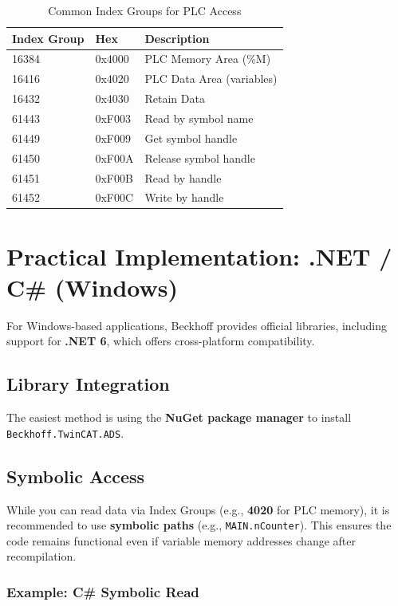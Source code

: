 \documentclass[11pt,a4paper]{article}
\begin{document}
\begin{table}[h]
\centering
\begin{tabular}{@{}lll@{}}
\toprule
\textbf{Index Group} & \textbf{Hex} & \textbf{Description} \\
\midrule
16384 & 0x4000 & PLC Memory Area (\%M) \\
16416 & 0x4020 & PLC Data Area (variables) \\
16432 & 0x4030 & Retain Data \\
61443 & 0xF003 & Read by symbol name \\
61449 & 0xF009 & Get symbol handle \\
61450 & 0xF00A & Release symbol handle \\
61451 & 0xF00B & Read by handle \\
61452 & 0xF00C & Write by handle \\
\bottomrule
\end{tabular}
\caption{Common Index Groups for PLC Access}
\end{table}

\section{Practical Implementation: .NET / C\# (Windows)}

For Windows-based applications, Beckhoff provides official libraries, including support for \textbf{.NET 6}, which offers cross-platform compatibility.

\subsection{Library Integration}

The easiest method is using the \textbf{NuGet package manager} to install \texttt{Beckhoff.TwinCAT.ADS}.

\subsection{Symbolic Access}

While you can read data via Index Groups (e.g., \textbf{4020} for PLC memory), it is recommended to use \textbf{symbolic paths} (e.g., \texttt{MAIN.nCounter}). This ensures the code remains functional even if variable memory addresses change after recompilation.

\subsubsection*{Example: C\# Symbolic Read}
\end{document}
